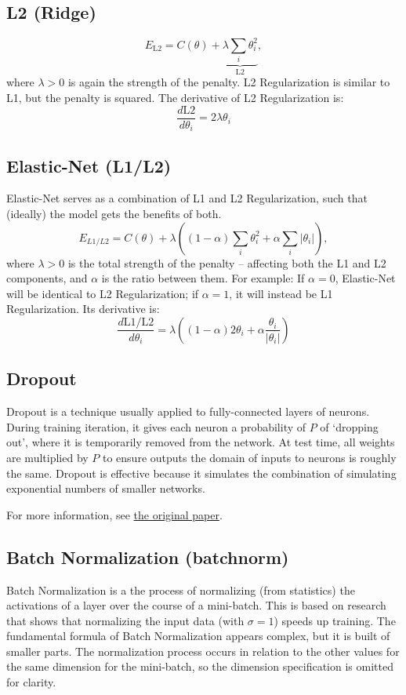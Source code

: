 \documentclass[fleqn]{article}
\begin{document}
\subsection{L2 (Ridge)}
\[ E_\text{L2} = C(\theta) +
\underbrace{\lambda{\sum}_i \theta_i^2}_\text{L2}, \]
%
where $\lambda > 0$ is again the strength of the penalty. L2
Regularization is similar to L1, but the penalty is squared. The
derivative of L2 Regularization is:
\[ \frac{d \text{L2}}{d \theta_i} = 2 \lambda \theta_i \]

\subsection{Elastic-Net (L1/L2)}

Elastic-Net serves as a combination of L1 and L2 Regularization, such that
(ideally) the model gets the benefits of both.
\[ E_{L1/L2} = C(\theta) + \lambda(
	(1 - \alpha){\sum}_i \theta_i^2 +
	\alpha{\sum}_i |\theta_i|
), \]
%
where $\lambda > 0$ is the total strength of the penalty -- affecting both
the L1 and L2 components, and $\alpha$ is the ratio between them. For
example: If $\alpha=0$, Elastic-Net will be identical to L2
Regularization; if $\alpha=1$, it will instead be L1 Regularization. Its
derivative is:
\[ \frac{d \text{L1/L2}}{d \theta_i} =
\lambda((1-\alpha) 2\theta_i + \alpha\frac{\theta_i}{|\theta_i|}) \]

\subsection{Dropout}
Dropout is a technique usually applied to fully-connected layers of
neurons. During training iteration, it gives each neuron a probability of
$P$ of `dropping out', where it is temporarily removed from the network.
At test time, all weights are multiplied by $P$ to ensure outputs the
domain of inputs to neurons is roughly the same. Dropout is effective
because it simulates the combination of simulating exponential numbers of
smaller networks.

For more information, see
\href{http://jmlr.org/papers/volume15/srivastava14a.old/srivastava14a.pdf}
{the original paper}.

\subsection{Batch Normalization (batchnorm)}
Batch Normalization is a the process of normalizing (from statistics) the
activations of a layer over the course of a mini-batch. This is based on
research that shows that normalizing the input data (with $\sigma=1$)
speeds up training. The fundamental formula of Batch Normalization appears
complex, but it is built of smaller parts. The normalization process
occurs in relation to the other values for the same dimension for the
mini-batch, so the dimension specification is omitted for clarity.
\end{document}
